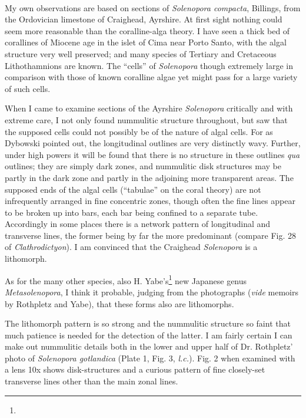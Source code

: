 \documentclass[a4paper, 12pt, oneside]{article}
\begin{document}
\paragraph{}
My own observations are based on sections of \emph{Solenopora compacta}, Billings, from the Ordovician limestone of Craighead, Ayrshire. At first sight nothing could seem more reasonable than the coralline-alga theory. I have seen a thick bed of corallines of Miocene age in the islet of Cima near Porto Santo, with the algal structure very well preserved; and many species of Tertiary and Cretaceous Lithothamnions are known. The ``cells'' of \emph{Solenopora} though extremely large in comparison with those of known coralline algae yet might pass for a large variety of such cells.

When I came to examine sections of the Ayrshire \emph{Solenopora} critically and with extreme care, I not only found nummulitic structure throughout, but saw that the supposed cells could not possibly be of the nature of algal cells. For as Dybowski pointed out, the longitudinal outlines are very distinctly wavy. Further, under high powers it will be found that there is no structure in these outlines \emph{qua} outlines; they are simply dark zones, and nummulitic disk structures may be partly in the dark zone and partly in the adjoining more transparent areas. The supposed ends of the algal cells (``tabulae'' on the coral theory) are not infrequently arranged in fine concentric zones, though often the fine lines appear to be broken up into bars, each bar being confined to a separate tube. Accordingly in some places there is a network pattern of longitudinal and transverse lines, the former being by far the more predominant (compare Fig. 28 of \emph{Clathrodictyon}). I am convinced that the Craighead \emph{Solenopora} is a lithomorph.

As for the many other species, also H. Yabe's\footnote{} new Japanese genus \emph{Metasolenopora}, I think it probable, judging from the photographs (\emph{vide} memoirs by Rothpletz and Yabe), that these forms also are lithomorphs.

The lithomorph pattern is so strong and the nummulitic structure so faint that much patience is needed for the detection of the latter. I am fairly certain I can make out nummulitic details both in the lower and upper half of Dr. Rothpletz' photo of \emph{Solenopora gotlandica} (Plate 1, Fig. 3, \emph{l.c.}). Fig. 2 when examined with a lens 10x shows disk-structures and a curious pattern of fine closely-set transverse lines other than the main zonal lines.
\end{document}
